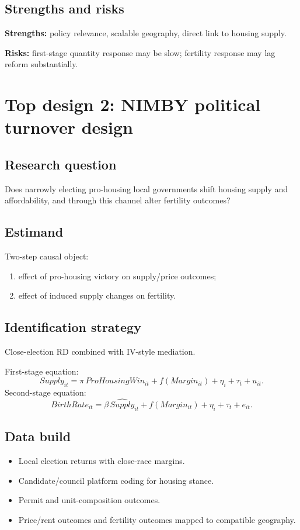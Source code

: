 \documentclass[11pt]{article}
\begin{document}
\subsection*{Strengths and risks}
\textbf{Strengths:} policy relevance, scalable geography, direct link to housing supply.

\textbf{Risks:} first-stage quantity response may be slow; fertility response may lag reform substantially.

\section{Top design 2: NIMBY political turnover design}
\subsection*{Research question}
Does narrowly electing pro-housing local governments shift housing supply and affordability, and through this channel alter fertility outcomes?

\subsection*{Estimand}
Two-step causal object:
\begin{enumerate}
\item effect of pro-housing victory on supply/price outcomes;
\item effect of induced supply changes on fertility.
\end{enumerate}

\subsection*{Identification strategy}
Close-election RD combined with IV-style mediation.

First-stage equation:
\[
Supply_{it}=\pi\,ProHousingWin_{it}+f(Margin_{it})+\eta_i+\tau_t+u_{it}.
\]
Second-stage equation:
\[
BirthRate_{it}=\beta\,\widehat{Supply}_{it}+f(Margin_{it})+\eta_i+\tau_t+e_{it}.
\]

\subsection*{Data build}
\begin{itemize}
\item Local election returns with close-race margins.
\item Candidate/council platform coding for housing stance.
\item Permit and unit-composition outcomes.
\item Price/rent outcomes and fertility outcomes mapped to compatible geography.
\end{itemize}
\end{document}
